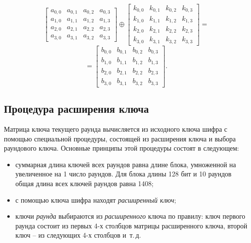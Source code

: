 \[
    \left[ \begin{array}{cccc}
        a_{0,0} & a_{0,1} & a_{0,2} & a_{0,3} \\
        a_{1,0} & a_{1,1} & a_{1,2} & a_{1,3} \\
        a_{2,0} & a_{2,1} & a_{2,2} & a_{2,3} \\
        a_{3,0} & a_{3,1} & a_{3,2} & a_{3,3}
    \end{array} \right]
    \oplus
    \left[ \begin{array}{cccc}
        k_{0,0} & k_{0,1} & k_{0,2} & k_{0,3} \\
        k_{1,0} & k_{1,1} & k_{1,2} & k_{1,3} \\
        k_{2,0} & k_{2,1} & k_{2,2} & k_{2,3} \\
        k_{3,0} & k_{3,1} & k_{3,2} & k_{3,3}
    \end{array} \right] =
\] \[
    = \left[ \begin{array}{cccc}
        b_{0,0} & b_{0,1} & b_{0,2} & b_{0,3} \\
        b_{1,0} & b_{1,1} & b_{1,2} & b_{1,3} \\
        b_{2,0} & b_{2,1} & b_{2,2} & b_{2,3} \\
        b_{3,0} & b_{3,1} & b_{3,2} & b_{3,3}
    \end{array} \right].
\]


\subsection{Процедура расширения ключа}

Матрица ключа текущего раунда вычисляется из исходного ключа шифра с помощью специальной процедуры, состоящей из расширения ключа и выбора раундового ключа. Основные принципы этой процедуры состоят в следующем:
\begin{itemize}
    \item суммарная длина ключей всех раундов равна длине блока, умноженной на увеличенное на 1 число раундов. Для блока длины 128 бит и 10 раундов общая длина всех ключей раундов равна 1408;
    \item с помощью ключа шифра находят \emph{расширенный ключ};
    \item ключи \emph{раунда} выбираются из \emph{расширенного} ключа по правилу: ключ первого раунда состоит из первых 4-х столбцов матрицы расширенного ключа, второй ключ -- из следующих 4-х столбцов и~т.\,д.
\end{itemize}

